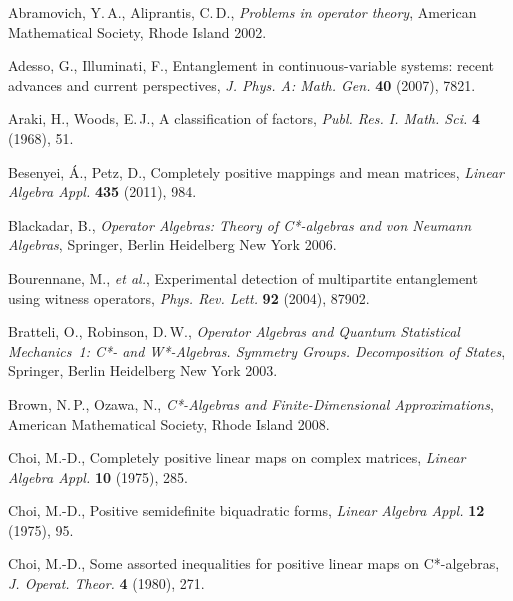 \clearpage
{}
{\footnotesize 
\renewcommand{\bibname}{Bibliografia}

\begin{thebibliography}{99}

    Abramovich, Y.\,A., Aliprantis, C.\,D.,
    \emph{Problems in operator theory},
    American Mathematical Society, Rhode Island 2002.

    Adesso, G., Illuminati, F.,
    Entanglement in continuous-variable systems: recent advances and current perspectives,
    \emph{J. Phys. A: Math. Gen.} {\bf 40} (2007), 7821.

    Araki, H., Woods, E.\,J.,
    A classification of factors,
    \emph{Publ. Res. I. Math. Sci.} {\bf 4} (1968), 51.

    Besenyei, {\'A}., Petz, D.,
    Completely positive mappings and mean matrices,
    \emph{Linear Algebra Appl.} {\bf 435} (2011), 984.

    Blackadar, B., \emph{Operator Algebras: Theory of C*-algebras and von Neumann Algebras},
    Springer, Berlin Heidelberg New York 2006.

    Bourennane, M., \emph{et al.},
    Experimental detection of multipartite entanglement using witness operators,
    \emph{Phys. Rev. Lett.} {\bf 92} (2004), 87902.

    Bratteli, O., Robinson, D.\,W.,
    \emph{Operator Algebras and Quantum Statistical \mbox{Mechanics 1:} C*- and W*-Algebras. Symmetry Groups. Decomposition of States},
    Springer, Berlin Heidelberg New York 2003.

    Brown, N.\,P., Ozawa, N.,
    \emph{C*-Algebras and Finite-Dimensional Approximations},
    American Mathematical Society, Rhode Island 2008.

    Choi, M.-D.,
    Completely positive linear maps on complex matrices,
    \emph{Linear Algebra Appl.} {\bf 10} (1975), 285.

    Choi, M.-D.,
    Positive semidefinite biquadratic forms,
    \emph{Linear Algebra Appl.} {\bf 12} (1975), 95.

    Choi, M.-D.,
    Some assorted inequalities for positive linear maps on C*-algebras,
    \emph{J. Operat. Theor.} {\bf 4} (1980), 271.


\end{thebibliography}}
